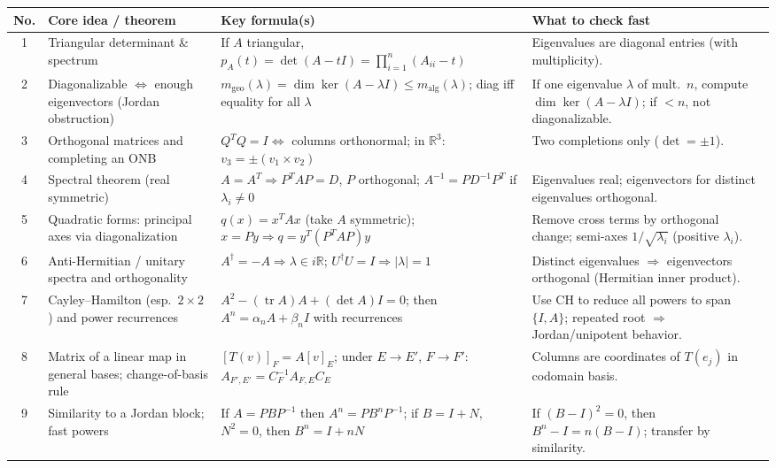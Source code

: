 \documentclass[12pt,a4paper]{article}
\DeclareMathOperator{\tr}{tr}
\theoremstyle{plain}
\theoremstyle{definition}      %
\begin{document}
\renewcommand{\arraystretch}{1.25}
\begin{tabular}{|c|p{4.2cm}|p{6.6cm}|p{4.2cm}|}
	\hline
	\textbf{No.} & \textbf{Core idea / theorem} & \textbf{Key formula(s)} & \textbf{What to check fast} \\
	\hline
	1 &
	Triangular determinant \& spectrum &
	If $A$ triangular, $p_A(t)=\det(A-tI)=\prod_{i=1}^n (A_{ii}-t)$ &
	Eigenvalues are diagonal entries (with multiplicity). \\
	\hline
	2 &
	Diagonalizable $\Leftrightarrow$ enough eigenvectors (Jordan obstruction) &
	$m_{\mathrm{geo}}(\lambda)=\dim\ker(A-\lambda I)\le m_{\mathrm{alg}}(\lambda)$; diag iff equality for all $\lambda$ &
	If one eigenvalue $\lambda$ of mult.\ $n$, compute $\dim\ker(A-\lambda I)$; if $<n$, not diagonalizable. \\
	\hline
	3 &
	Orthogonal matrices and completing an ONB &
	$Q^TQ=I\iff$ columns orthonormal; in $\mathbb R^3$: $v_3=\pm(v_1\times v_2)$ &
	Two completions only ($\det=\pm1$). \\
	\hline
	4 &
	Spectral theorem (real symmetric) &
	$A=A^T\Rightarrow P^TAP=D$, $P$ orthogonal; $A^{-1}=PD^{-1}P^T$ if $\lambda_i\neq 0$ &
	Eigenvalues real; eigenvectors for distinct eigenvalues orthogonal. \\
	\hline
	5 &
	Quadratic forms: principal axes via diagonalization &
	$q(x)=x^TAx$ (take $A$ symmetric); $x=Py\Rightarrow q=y^T(P^TAP)y$ &
	Remove cross terms by orthogonal change; semi-axes $1/\sqrt{\lambda_i}$ (positive $\lambda_i$). \\
	\hline
	6 &
	Anti-Hermitian / unitary spectra and orthogonality &
	$A^\dagger=-A\Rightarrow \lambda\in i\mathbb R$;
	$U^\dagger U=I\Rightarrow |\lambda|=1$ &
	Distinct eigenvalues $\Rightarrow$ eigenvectors orthogonal (Hermitian inner product). \\
	\hline
	7 &
	Cayley--Hamilton (esp.\ $2\times2$) and power recurrences &
	$A^2-(\tr A)A+(\det A)I=0$;
	then $A^n=\alpha_n A+\beta_n I$ with recurrences &
	Use CH to reduce all powers to span$\{I,A\}$; repeated root $\Rightarrow$ Jordan/unipotent behavior. \\
	\hline
	8 &
	Matrix of a linear map in general bases; change-of-basis rule &
	$[T(v)]_F=A[v]_E$;
	under $E\to E'$, $F\to F'$:
	$A_{F',E'}=C_F^{-1}A_{F,E}C_E$ &
	Columns are coordinates of $T(e_j)$ in codomain basis. \\
	\hline
	9 &
	Similarity to a Jordan block; fast powers &
	If $A=PBP^{-1}$ then $A^n=PB^nP^{-1}$;
	if $B=I+N$, $N^2=0$, then $B^n=I+nN$ &
	If $(B-I)^2=0$, then $B^n-I=n(B-I)$; transfer by similarity. \\

\end{tabular}
\end{document}
